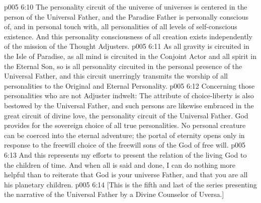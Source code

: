 \vs p005 6:10 \pc The personality circuit of the universe of universes is centered in the person of the Universal Father, and the Paradise Father is personally conscious of, and in personal touch with, all personalities of all levels of self\hyp{}conscious existence. And this personality consciousness of all creation exists independently of the mission of the Thought Adjusters.
\vs p005 6:11 \pc As all gravity is circuited in the Isle of Paradise, as all mind is circuited in the Conjoint Actor and all spirit in the Eternal Son, so is all personality circuited in the personal presence of the Universal Father, and this circuit unerringly transmits the worship of all personalities to the Original and Eternal Personality.
\vs p005 6:12 \pc Concerning those personalities who are not Adjuster indwelt: The attribute of choice\hyp{}liberty is also bestowed by the Universal Father, and such persons are likewise embraced in the great circuit of divine love, the personality circuit of the Universal Father. God provides for the sovereign choice of all true personalities. No personal creature can be coerced into the eternal adventure; the portal of eternity opens only in response to the freewill choice of the freewill sons of the God of free will.
\vs p005 6:13 \pc And this represents my efforts to present the relation of the living God to the children of time. And when all is said and done, I can do nothing more helpful than to reiterate that God is your universe Father, and that you are all his planetary children.
\vsetoff
\vs p005 6:14 [This is the fifth and last of the series presenting the narrative of the Universal Father by a Divine Counselor of Uversa.]
